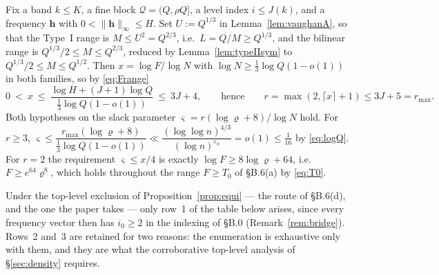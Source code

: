 \documentclass[11pt]{article}
\theoremstyle{definition}
\theoremstyle{plain}
\begin{document}
Fix a band $k\le K$, a fine block $\mathcal Q=(Q,\rho Q]$, a level index
$i\le J(k)$, and a frequency $\mathbf h$ with $0<\|\mathbf h\|_{\infty}\le
H$.  Set $U:=Q^{1/3}$ in Lemma~\ref{lem:vaughanA}, so that the Type~I
range is $M\le U^{2}=Q^{2/3}$, i.e.\ $L=Q/M\ge Q^{1/3}$, and the
bilinear range is $Q^{1/3}/2\le M\le Q^{2/3}$, reduced by
Lemma~\ref{lem:typeIIsym} to $Q^{1/3}/2\le M\le Q^{1/2}$.  Then
$x=\log F/\log N$ with $\log N\ge\tfrac13\log Q(1-o(1))$ in both
families, so by \eqref{eq:Frange}
\begin{equation}\label{eq:xrange}
0\ <\ x\ \le\ \frac{\log H+(J+1)\log Q}{\tfrac13\log Q(1-o(1))}
\ \le\ 3J+4,
\qquad\text{hence}\qquad r=\max(2,\lceil x\rceil+1)\le3J+5=r_{\max}.
\end{equation}
Both hypotheses on the slack parameter
$\varsigma=r(\log\varrho+8)/\log N$ hold.  For $r\ge3$,
$\varsigma\le\dfrac{r_{\max}(\log\varrho+8)}{\tfrac13\log Q(1-o(1))}
\ll\dfrac{(\log\log n)^{4/3}}{(\log n)^{\varepsilon_{n}}}=o(1)\le
\tfrac1{16}$ by \eqref{eq:logQ}.  For $r=2$ the requirement
$\varsigma\le x/4$ is exactly $\log F\ge8\log\varrho+64$, i.e.\
$F\ge e^{64}\varrho^{8}$, which holds throughout the range $F\ge T_{0}$
of \S B.6(a) by \eqref{eq:T0}.

Under the top-level exclusion of Proposition~\ref{prop:equi} --- the
route of \S B.6(d), and the one the paper takes --- only row~1 of the
table below arises, since every frequency vector then has $i_{0}\ge2$ in
the indexing of \S B.0 (Remark~\ref{rem:bridge}).  Rows~2 and~3 are
retained for two reasons: the enumeration is exhaustive only with them,
and they are what the corroborative top-level analysis of
\S\ref{sec:density} requires.
\end{document}
